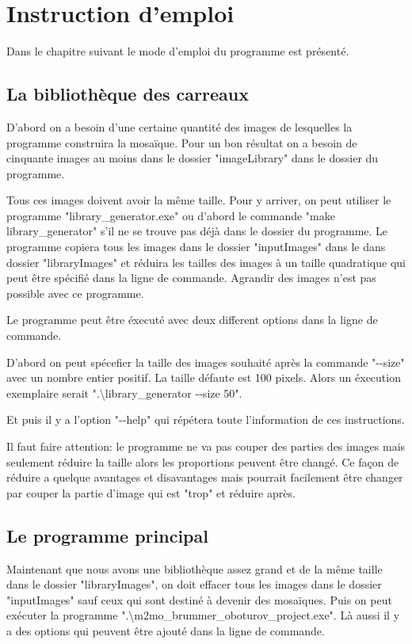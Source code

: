 \documentclass[a4paper]{article}
\begin{document}
\section{Instruction d'emploi}
Dans le chapitre suivant le mode d'emploi du programme est pr\'esent\'e.
\subsection{La biblioth\`eque des carreaux}
D'abord on a besoin d'une certaine quantit\'e des images de lesquelles la programme construira la mosa\"{i}que.
 Pour un bon r\'esultat on a besoin de cinquante images au moins dans le dossier "imageLibrary" dans le dossier du programme.

Tous ces images doivent avoir la m\^eme taille.
Pour y arriver, on peut utiliser le programme "library\_generator.exe" ou d'abord le commande "make library\_generator" s'il ne se trouve pas d\'ej\`a dans le dossier du programme.
 Le programme copiera tous les images dans le dossier "inputImages" dans le dans dossier "libraryImages" et r\'eduira les tailles des images \`a un taille quadratique qui peut \^etre sp\'ecifi\'e dans la ligne de commande.
 Agrandir des images n'est pas possible avec ce programme.
 
 Le programme peut \^etre \'execut\'e avec deux different options dans la ligne de commande.
 
 D'abord on peut sp\'ecefier la taille des images souhait\'e apr\`es la commande "{-}{-}size" avec un nombre entier positif.
 La taille d\'efaute est 100 pixels.
Alors un \'execution exemplaire serait ".\textbackslash library\_generator {-}{-}size 50".

Et puis il y a l'option "{-}{-}help" qui r\'ep\'etera toute l'information de ces instructions.

Il faut faire attention: le programme ne va pas couper des parties des images mais seulement r\'eduire la taille alors les proportions peuvent \^etre chang\'e.
Ce fa\c{c}on de r\'eduire a quelque avantages et disavantages mais pourrait facilement \^etre changer par couper la partie d'image qui est "trop" et r\'eduire apr\`es.

\subsection{Le programme principal}
Maintenant que nous avons une biblioth\`eque assez grand et de la m\^eme taille dans le dossier "libraryImages", on doit effacer tous les images dans le dossier "inputImages" sauf ceux qui sont destin\'e \`a devenir des mosa\"iques.
Puis on peut ex\'ecuter la programme ".\textbackslash m2mo\_brummer\_oboturov\_project.exe".
L\`a aussi il y a des options qui peuvent \^etre ajout\'e dans la ligne de commande.
\end{document}
